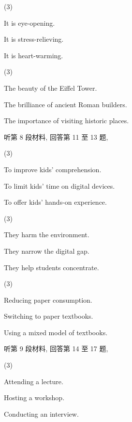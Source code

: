 \documentclass{英语试卷}
\begin{document}
\begin{choices}(3)
  \item It is eye-opening.
  \item It is stress-relieving.
  \item It is heart-warming.
\end{choices}
\begin{choices}(3)
  \item The beauty of the Eiffel Tower.
  \item The brilliance of ancient Roman builders.
  \item The importance of visiting historic places.
\end{choices}
\par 听第 8 段材料, 回答第 11 至 13 题,\par
{}
\begin{choices}(3)
  \item To improve kids' comprehension.
  \item To limit kids' time on digital devices.
  \item To offer kids' hands-on experience.
\end{choices}
\begin{choices}(3)
  \item They harm the environment.
  \item They narrow the digital gap.
  \item They help students concentrate.
\end{choices}
\begin{choices}(3)
  \item Reducing paper consumption.
  \item Switching to paper textbooks.
  \item Using a mixed model of textbooks.
\end{choices}
\par 听第 9 段材料, 回答第 14 至 17 题,\par
{}
\begin{choices}(3)
  \item Attending a lecture.
  \item Hosting a workshop.
  \item Conducting an interview.
\end{choices}
\end{document}
